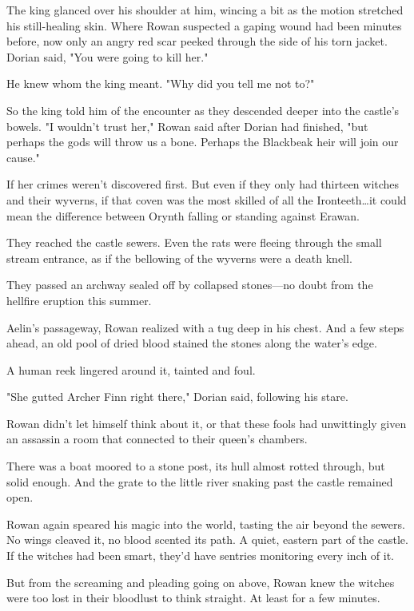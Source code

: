 The king glanced over his shoulder at him, wincing a bit as the motion stretched his still-healing skin.
Where Rowan suspected a gaping wound had been minutes before, now only an angry red scar peeked through the side of his torn jacket.
Dorian said, "You were going to kill her."

He knew whom the king meant.
"Why did you tell me not to?"

So the king told him of the encounter as they descended deeper into the castle's bowels.
"I wouldn't trust her," Rowan said after Dorian had finished, "but perhaps the gods will throw us a bone.
Perhaps the Blackbeak heir will join our cause."

If her crimes weren't discovered first.
But even if they only had thirteen witches and their wyverns, if that coven was the most skilled of all the Ironteeth\ldots it could mean the difference between Orynth falling or standing against Erawan.

They reached the castle sewers.
Even the rats were fleeing through the small stream entrance, as if the bellowing of the wyverns were a death knell.

They passed an archway sealed off by collapsed stones---no doubt from the hellfire eruption this summer.

Aelin's passageway, Rowan realized with a tug deep in his chest.
And a few steps ahead, an old pool of dried blood stained the stones along the water's edge.

A human reek lingered around it, tainted and foul.

"She gutted Archer Finn right there," Dorian said, following his stare.

Rowan didn't let himself think about it, or that these fools had unwittingly given an assassin a room that connected to their queen's chambers.

There was a boat moored to a stone post, its hull almost rotted through, but solid enough.
And the grate to the little river snaking past the castle remained open.

Rowan again speared his magic into the world, tasting the air beyond the sewers.
No wings cleaved it, no blood scented its path.
A quiet, eastern part of the castle.
If the witches had been smart, they'd have sentries monitoring every inch of it.

But from the screaming and pleading going on above, Rowan knew the witches were too lost in their bloodlust to think straight.
At least for a few minutes.

